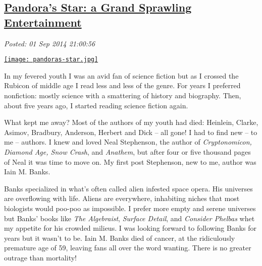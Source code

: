%

\subsection*{\href{https://bakerjd99.wordpress.com/2014/09/01/pandoras-star-a-grand-sprawling-entertainment/}{Pandora's Star: a Grand Sprawling Entertainment}}


\noindent\emph{Posted: 01 Sep 2014 21:00:56}
\vspace{6pt}


\captionsetup[floatingfigure]{labelformat=empty}
\begin{floatingfigure}[l]{0.24\textwidth}
\centering
\href{http://www.barnesandnoble.com/w/pandoras-star-peter-f-hamilton/1100293432?ean=9780345479211}{\texttt{[image: pandoras-star.jpg]}}
\label{fig:4817X0}
\end{floatingfigure} In
my fevered youth I was an avid fan of science fiction but as I crossed
the Rubicon of middle age I read less and less of the genre. For years I
preferred nonfiction: mostly science with a smattering of history and
biography. Then, about five years ago, I started reading science fiction
again.

What kept me away? Most of the authors of my youth had died: Heinlein,
Clarke, Asimov, Bradbury, Anderson, Herbert and Dick -- all gone! I had
to find new -- to me -- authors. I knew and loved Neal Stephenson, the
author of \emph{Cryptonomicon, Diamond Age, Snow Crash}, and
\emph{Anathem}, but after four or five thousand pages of Neal it was
time to move on. My first post Stephenson, new to me, author was Iain M.
Banks.

Banks specialized in what's often called alien infested space opera. His
universes are overflowing with life. Aliens are everywhere, inhabiting
niches that most biologists would poo-poo as impossible. I prefer more
empty and serene universes but Banks' books like \emph{The Algebraist},
\emph{Surface Detail}, and \emph{Consider Phelbas} whet my appetite for
his crowded milieus. I was looking forward to following Banks for years
but it wasn't to be. Iain M. Banks died of cancer, at the ridiculously
premature age of 59, leaving fans all over the word wanting. There is no
greater outrage than mortality!

